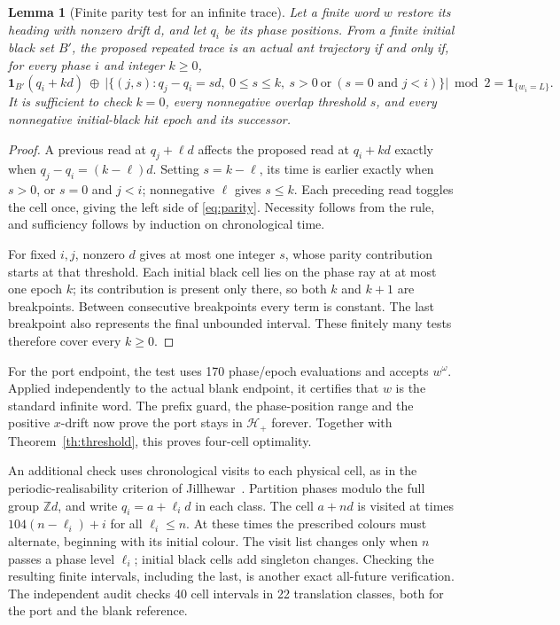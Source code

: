 \documentclass[11pt]{article}
\newtheorem{lemma}[theorem]{Lemma}
\newcommand{\Z}{\mathbb Z}
\newcommand{\HH}{\mathcal H}
\begin{document}
\begin{lemma}[Finite parity test for an infinite trace]\label{lem:parity}
Let a finite word $w$ restore its heading with nonzero drift $d$, and let
$q_i$ be its phase positions. From a finite initial black set $B'$, the
proposed repeated trace is an actual ant trajectory if and only if, for every
phase $i$ and integer $k\ge0$,
\begin{equation}\label{eq:parity}
 \mathbf1_{B'}(q_i+kd)\ \oplus\
 \bigl|\{(j,s):q_j-q_i=sd,\ 0\le s\le k,
                 \ s>0\ \text{or}\ (s=0\text{ and }j<i)\}\bigr|\bmod2
 =\mathbf1_{\{w_i=L\}}.
\end{equation}
It is sufficient to check $k=0$, every nonnegative overlap threshold $s$,
and every nonnegative initial-black hit epoch and its successor.
\end{lemma}
\begin{proof}
A previous read at $q_j+\ell d$ affects the proposed read at $q_i+kd$
exactly when $q_j-q_i=(k-\ell)d$. Setting $s=k-\ell$, its time is earlier
exactly when $s>0$, or $s=0$ and $j<i$; nonnegative $\ell$ gives $s\le k$.
Each preceding read toggles the cell once, giving the left side of
\eqref{eq:parity}. Necessity follows from the rule, and sufficiency follows
by induction on chronological time.

For fixed $i,j$, nonzero $d$ gives at most one integer $s$, whose parity
contribution starts at that threshold. Each initial black cell lies on the
phase ray at at most one epoch $k$; its contribution is present only there,
so both $k$ and $k+1$ are breakpoints. Between consecutive breakpoints every
term is constant. The last breakpoint also represents the final unbounded
interval. These finitely many tests therefore cover every $k\ge0$.
\end{proof}

For the port endpoint, the test uses 170 phase/epoch evaluations and accepts
$w^\omega$. Applied independently to the actual blank endpoint, it certifies
that $w$ is the standard infinite word. The prefix guard, the phase-position
range and the positive $x$-drift now prove the port stays in $\HH_+$ forever.
Together with Theorem~\ref{th:threshold}, this proves four-cell optimality.

An additional check uses chronological visits to each physical cell, as in
the periodic-realisability criterion of Jillhewar~\cite{jillhewar2026}.
Partition phases modulo the full group $\Z d$, and write
$q_i=a+\ell_i d$ in each class. The cell $a+nd$ is visited at times
$104(n-\ell_i)+i$ for all $\ell_i\le n$. At these times the prescribed
colours must alternate, beginning with its initial colour. The visit list
changes only when $n$ passes a phase level $\ell_i$; initial black cells add
singleton changes. Checking the resulting finite intervals, including the
last, is another exact all-future verification. The independent audit checks
40 cell intervals in 22 translation classes, both for the port and the
blank reference.
\end{document}

